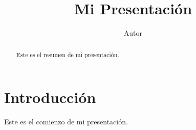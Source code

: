 \documentclass{IEEEtran}
\begin{document}
\title{Mi Presentación}
\author{Autor}
\maketitle
\begin{abstract}
Este es el resumen de mi presentación.
\end{abstract}
\section{Introducción}
Este es el comienzo de mi presentación.
\end{document}
